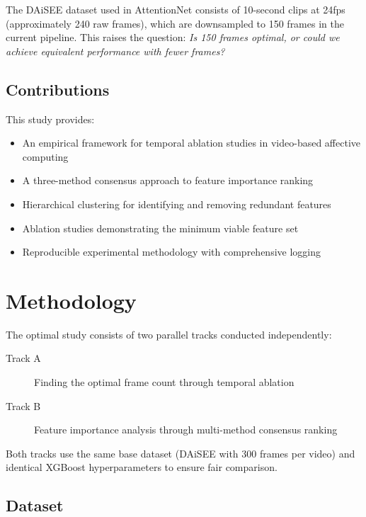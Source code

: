 \documentclass[11pt,a4paper]{article}
\begin{document}
The DAiSEE dataset used in AttentionNet consists of 10-second clips at 24fps (approximately 240 raw frames), which are downsampled to 150 frames in the current pipeline. This raises the question: \textit{Is 150 frames optimal, or could we achieve equivalent performance with fewer frames?}

\subsection{Contributions}

This study provides:
\begin{itemize}
  \item An empirical framework for temporal ablation studies in video-based affective computing
  \item A three-method consensus approach to feature importance ranking
  \item Hierarchical clustering for identifying and removing redundant features
  \item Ablation studies demonstrating the minimum viable feature set
  \item Reproducible experimental methodology with comprehensive logging
\end{itemize}

\section{Methodology}\label{sec:methodology}

The optimal study consists of two parallel tracks conducted independently:

\begin{description}
  \item[Track A] Finding the optimal frame count through temporal ablation
  \item[Track B] Feature importance analysis through multi-method consensus ranking
\end{description}

Both tracks use the same base dataset (DAiSEE with 300 frames per video) and identical XGBoost hyperparameters to ensure fair comparison.

\subsection{Dataset}
\end{document}
